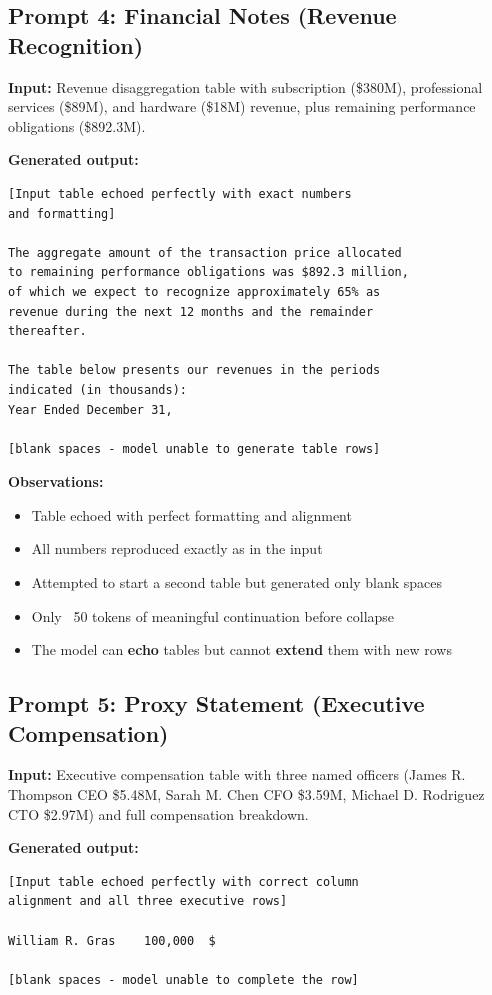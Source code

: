 \documentclass[12pt]{article}
\begin{document}
\subsection{Prompt 4: Financial Notes (Revenue Recognition)}

\textbf{Input:} Revenue disaggregation table with subscription (\$380M), professional services (\$89M), and hardware (\$18M) revenue, plus remaining performance obligations (\$892.3M).

\textbf{Generated output:}

\begin{Verbatim}[fontsize=\small]
[Input table echoed perfectly with exact numbers
and formatting]

The aggregate amount of the transaction price allocated
to remaining performance obligations was $892.3 million,
of which we expect to recognize approximately 65% as
revenue during the next 12 months and the remainder
thereafter.

The table below presents our revenues in the periods
indicated (in thousands):
Year Ended December 31,

[blank spaces - model unable to generate table rows]
\end{Verbatim}

\textbf{Observations:}
\begin{itemize}
    \item Table echoed with perfect formatting and alignment
    \item All numbers reproduced exactly as in the input
    \item Attempted to start a second table but generated only blank spaces
    \item Only ~50 tokens of meaningful continuation before collapse
    \item The model can \textbf{echo} tables but cannot \textbf{extend} them with new rows
\end{itemize}

\subsection{Prompt 5: Proxy Statement (Executive Compensation)}

\textbf{Input:} Executive compensation table with three named officers (James R. Thompson CEO \$5.48M, Sarah M. Chen CFO \$3.59M, Michael D. Rodriguez CTO \$2.97M) and full compensation breakdown.

\textbf{Generated output:}

\begin{Verbatim}[fontsize=\small]
[Input table echoed perfectly with correct column
alignment and all three executive rows]

William R. Gras    100,000  $

[blank spaces - model unable to complete the row]
\end{Verbatim}
\end{document}
